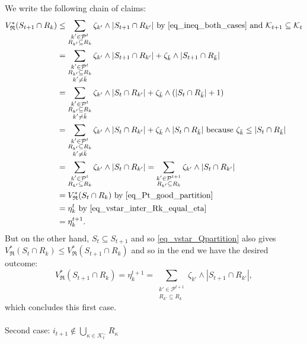 \documentclass[
  11pt,
  a4paper,
]{article}
\makeatletter
\let\oldparagraph\paragraph
\renewcommand{\paragraph}{
    \@ifstar
      \xxxParagraphStar
      \xxxParagraphNoStar
  }
\newcommand{\xxxParagraphStar}[1]{\oldparagraph*{#1}\mbox{}}
\newcommand{\xxxParagraphNoStar}[1]{\oldparagraph{#1}\mbox{}}
\theoremstyle{plain}
\theoremstyle{definition}
\theoremstyle{plain}
\theoremstyle{definition}
\theoremstyle{plain}
\theoremstyle{remark}
\makeatother
\begin{document}
We write the following chain of claims: \begin{align*}
V^*_{\mathfrak{R}}(S_{t+1}\cap R_k)&\leq \sum_{\substack{k'\in\mathcal{P}^{t}\\R_{k'}\subseteq R_k}} \zeta_{k'}\wedge |S_{t+1}\cap R_{k'}|\text{ by~\eqref{eq_ineq_both_cases} and }\mathcal{K}_{t+1}\subseteq\mathcal{K}_t\\
&=\sum_{\substack{k'\in\mathcal{P}^{t}\\R_{k'}\subseteq R_k\\ k'\neq\bar k}} \zeta_{k'}\wedge |S_{t+1}\cap R_{k'}| + \zeta_{\bar k}\wedge |S_{t+1}\cap R_{\bar k}| \\
&=\sum_{\substack{k'\in\mathcal{P}^{t}\\R_{k'}\subseteq R_k\\ k'\neq\bar k}} \zeta_{k'}\wedge |S_{t}\cap R_{k'}| + \zeta_{\bar k}\wedge( |S_{t}\cap R_{\bar k}| +1)\\
&=\sum_{\substack{k'\in\mathcal{P}^{t}\\R_{k'}\subseteq R_k\\ k'\neq\bar k}} \zeta_{k'}\wedge |S_{t}\cap R_{k'}| + \zeta_{\bar k}\wedge|S_{t}\cap R_{\bar k}|\text{ because $\zeta_{\bar k}\leq |S_t\cap R_{\bar k}|$}\\
&=\sum_{\substack{k'\in\mathcal{P}^{t}\\R_{k'}\subseteq R_k}} \zeta_{k'}\wedge |S_{t}\cap R_{k'}|=\sum_{\substack{k'\in\mathcal{P}^{t+1}\\R_{k'}\subseteq R_k}} \zeta_{k'}\wedge |S_{t}\cap R_{k'}| \\
&=V^*_{\mathfrak{R}}(S_t\cap R_k)  \text{ by~\eqref{eq_Pt_good_partition}} \\
&= \eta_k^t  \text{ by~\eqref{eq_vstar_inter_Rk_equal_eta}} \\
&= \eta_k^{t+1}.\\
\end{align*} But on the other hand, \(S_t\subseteq S_{t+1}\) and so
\eqref{eq_vstar_Qpartition} also gives
\(V^*_{\mathfrak{R}}(S_t\cap R_k) \leq V^*_{\mathfrak{R}}(S_{t+1}\cap R_k)\)
and so in the end we have the desired outcome: \begin{equation*}
V^*_{\mathfrak{R}}(S_{t+1}\cap R_k) =  \eta_k^{t+1} =  \sum_{\substack{k'\in\mathcal{P}^{t+1}\\R_{k'}\subseteq R_k}} \zeta_{k'}\wedge |S_{t+1}\cap R_{k'}| ,
\end{equation*} which concludes this first case.

\paragraph{\texorpdfstring{Second case:
\(i_{t+1}\not\in\bigcup_{\kappa\in\mathcal{K}^-_{t}}R_{\kappa}\)}{Second case: i\_\{t+1\}\textbackslash not\textbackslash in\textbackslash bigcup\_\{\textbackslash kappa\textbackslash in\textbackslash mathcal\{K\}\^{}-\_\{t\}\}R\_\{\textbackslash kappa\}}}\label{second-case-i_t1notinbigcup_kappainmathcalk-_tr_kappa}
\end{document}
